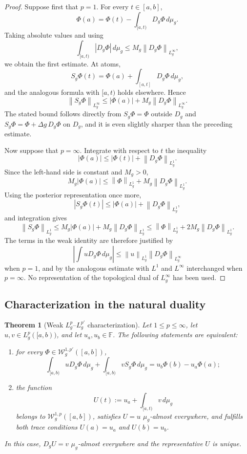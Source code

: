 \documentclass[preprint,12pt]{elsarticle}
\newcommand{\rev}[1]{{\color{red}#1}}
\newcommand{\rev}[1]{#1}
\newtheorem{theorem}{Theorem}[section]
\theoremstyle{definition}
\theoremstyle{remark}
\newcommand{\F}{\mathbb F}
\newcommand{\norm}[1]{\left\lVert#1\right\rVert}
\newcommand{\abs}[1]{\left\lvert#1\right\rvert}
\begin{document}
\begin{proof}
Suppose first that $p=1$. For every $t\in[a,b]$,
\[
 \Phi(a)=\Phi(t)-\int_{[a,t)}D_g\Phi\,d\mu_g.
\]
Taking absolute values and using
\[
 \int_{[a,t)}\abs{D_g\Phi}\,d\mu_g
 \le M_g\norm{D_g\Phi}_{L_g^\infty},
\]
we obtain the first estimate. At atoms,
\[
 S_g\Phi(t)=\Phi(a)+\int_{[a,t]}D_g\Phi\,d\mu_g,
\]
and the analogous formula with $[a,t)$ holds elsewhere. Hence
\[
 \norm{S_g\Phi}_{L_g^\infty}
 \le \abs{\Phi(a)}+M_g\norm{D_g\Phi}_{L_g^\infty}.
\]
The stated bound follows directly from $S_g\Phi=\Phi$ outside $D_g$ and $S_g\Phi=\Phi+\Delta g\,D_g\Phi$ on $D_g$, and it is even slightly sharper than the preceding estimate.

Now suppose that $p=\infty$. Integrate with respect to $t$ the inequality
\[
 \abs{\Phi(a)}\le \abs{\Phi(t)}+\norm{D_g\Phi}_{L_g^1}.
\]
Since the left-hand side is constant and $M_g>0$,
\[
 M_g\abs{\Phi(a)}
 \le \norm{\Phi}_{L_g^1}+M_g\norm{D_g\Phi}_{L_g^1}.
\]
Using the posterior representation once more,
\[
 \abs{S_g\Phi(t)}
 \le \abs{\Phi(a)}+\norm{D_g\Phi}_{L_g^1},
\]
and integration gives
\[
 \norm{S_g\Phi}_{L_g^1}
 \le M_g\abs{\Phi(a)}+M_g\norm{D_g\Phi}_{L_g^1}
 \le \norm{\Phi}_{L_g^1}+2M_g\norm{D_g\Phi}_{L_g^1}.
\]
The terms in the weak identity are therefore justified by
\[
 \abs{\textstyle\int uD_g\Phi\,d\mu_g}
 \le \norm{u}_{L_g^1}\norm{D_g\Phi}_{L_g^\infty}
\]
when $p=1$, and by the analogous estimate with $L^1$ and $L^\infty$ interchanged when $p=\infty$. No representation of the topological dual of $L_g^\infty$ has been used.
\end{proof}

\subsection{Characterization in the natural duality}

\begin{theorem}[Weak $L_g^p$--$L_g^{p'}$ characterization]\label{thm:weak-strong-p}
Let $1\le p\le\infty$, let $u,v\in L_g^p([a,b))$, and let $u_a,u_b\in\F$. The following statements are equivalent:
\begin{enumerate}[label=\roman*)]
 \item for every $\Phi\in\mathcal W_g^{1,p'}([a,b])$,
 \begin{equation}\label{eq:weak-p-duality}
  \int_{[a,b)}uD_g\Phi\,d\mu_g
  +\int_{[a,b)}vS_g\Phi\,d\mu_g
  =u_b\Phi(b)-u_a\Phi(a);
 \end{equation}
 \item the function
 \begin{equation}\label{eq:reconstruction-p}
  U(t):=u_a+\int_{[a,t)}v\,d\mu_g
 \end{equation}
 belongs to $\mathcal W_g^{1,p}([a,b])$, satisfies $U=u$ $\mu_g$-almost everywhere, and \rev{fulfills both trace conditions \(U(a)=u_a\) and \(U(b)=u_b\)}.
\end{enumerate}
In this case, $D_gU=v$ $\mu_g$-almost everywhere and the representative $U$ is unique.
\end{theorem}
\end{document}

